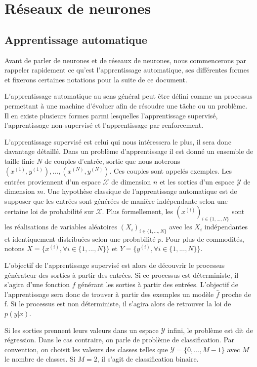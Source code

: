 \chapter{Réseaux de neurones}

\section{Apprentissage automatique}

Avant de parler de neurones et de réseaux de neurones, nous commencerons par rappeler rapidement ce qu'est l'apprentissage automatique, ses différentes formes et fixerons certaines notations pour la suite de ce document.

L'apprentissage automatique au sens général peut être défini comme un processus permettant à une machine d'évoluer afin de résoudre une tâche ou un problème. Il en existe plusieurs formes parmi lesquelles l'apprentissage supervisé, l'apprentissage non-supervisé et l'apprentissage par renforcement.

L'apprentissage supervisé est celui qui nous intéressera le plus, il sera donc davantage détaillé. Dans un problème d'apprentissage il est donné un ensemble de taille finie $N$ de couples d'entrée, sortie que nous noterons $(x^{(1)},y^{(1)}), ..., (x^{(N)}, y^{(N)})$. Ces couples sont appelés exemples. Les entrées proviennent d'un espace $\mathcal{X}$ de dimension $n$ et les sorties d'un espace $\mathcal{Y}$ de dimension $m$. Une hypothèse classique de l'apprentissage automatique est de supposer que les entrées sont générées de manière indépendante selon une certaine loi de probabilité sur $\mathcal{X}$. Plus formellement, les $(x^{(i)})_{i \in \{1, ..., N\}}$ sont les réalisations de variables aléatoires $(X_i)_{i \in \{1, ..., N\}}$ avec les $X_i$ indépendantes et identiquement distribuées selon une probabilité $p$. Pour plus de commodités, notons $X = \{x^{(i)}, \forall i \in \{1, ..., N\}\}$ et $Y = \{y^{(i)}, \forall i \in \{1, ..., N\}\}$.

L'objectif de l'apprentissage supervisé est alors de découvrir le processus générateur des sorties à partir des entrées. Si ce processus est déterministe, il s'agira d'une fonction $f$ générant les sorties à partir des entrées. L'objectif de l'apprentissage sera donc de trouver à partir des exemples un modèle $\hat{f}$ proche de f. Si le processus est non déterministe, il s'agira alors de retrouver la loi de $p(y|x)$.

Si les sorties prennent leurs valeurs dans un espace $\mathcal{Y}$ infini, le problème est dit de régression. Dans le cas contraire, on parle de problème de classification. Par convention, on choisit les valeurs des classes telles que $\mathcal{Y} = \{0, ..., M-1\}$ avec $M$ le nombre de classes. Si $M = 2$, il s'agit de classification binaire.

